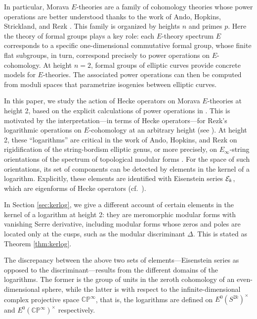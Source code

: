 \documentclass{gtpart}
\theoremstyle{definition}
\theoremstyle{remark}
\newcommand{\mb}[1]{\mathbb{#1}}
\newcommand{\CE}{{\cal E}}
\newcommand{\BC}{{\mb C}}
\newcommand{\BP}{{\mb P}}
\renewcommand{\D}{\Delta}
\renewcommand{\=}{\approx}
\renewcommand{\-}{\sim}
\numberwithin{equation}{section}
\begin{document}
In particular, Morava $E$-theories are a family of cohomology theories whose 
power operations are better understood thanks to the work of Ando, Hopkins, 
Strickland, and Rezk \cite{AHS04,cong,iph}.  This family is organized by heights 
$n$ and primes $p$.  Here the theory of formal groups plays a key role: each 
$E$-theory spectrum $E$ corresponds to a specific one-dimensional commutative 
formal group, whose finite flat subgroups, in turn, correspond precisely to 
power operations on $E$-cohomology.  At height $n = 2$, formal groups of 
elliptic curves provide concrete models for $E$-theories.  The associated power 
operations can then be computed from moduli spaces that parametrize isogenies 
between elliptic curves.  

In this paper, we study the action of Hecke operators on Morava $E$-theories at 
height 2, based on the explicit calculations of power operations in 
\cite{h2p2,p3}.  This is motivated by the interpretation---in terms of Hecke 
operators---for Rezk's logarithmic operations on $E$-cohomology at an arbitrary 
height (see \cite[1.12]{log}).  At height 2, these ``logarithms'' are critical 
in the work of Ando, Hopkins, and Rezk on rigidification of the string-bordism 
elliptic genus, or more precisely, on $E_\infty$-string orientations of the 
spectrum of topological modular forms \cite{koandtmf}.  For the space of such 
orientations, its set of components can be detected by elements in the kernel of 
a logarithm.  Explicitly, these elements are identified with Eisenstein series 
$\CE_k$, which are eigenforms of Hecke operators \cite[Theorem 12.3]{koandtmf} 
(cf.~\cite[Theorem 40]{Sprang}).  

In Section \ref{sec:kerlog}, we give a different account of certain elements in 
the kernel of a logarithm at height 2: they are meromorphic modular forms with 
vanishing Serre derivative, including modular forms whose zeros and poles are 
located only at the cusps, such as the modular discriminant $\D$.  This is 
stated as Theorem \ref{thm:kerlog}.  

The discrepancy between the above two sets of elements---Eisenstein series as 
opposed to the discriminant---results from the different domains of the 
logarithms.  The former is the group of units in the zeroth cohomology of an 
even-dimensional sphere, while the latter is with respect to the 
infinite-dimensional complex projective space $\BC\BP^\infty$, that is, the 
logarithms are defined on $E^0(S^{2 k})^\times$ and $E^0(\BC\BP^\infty)^\times$ 
respectively.  
\end{document}
